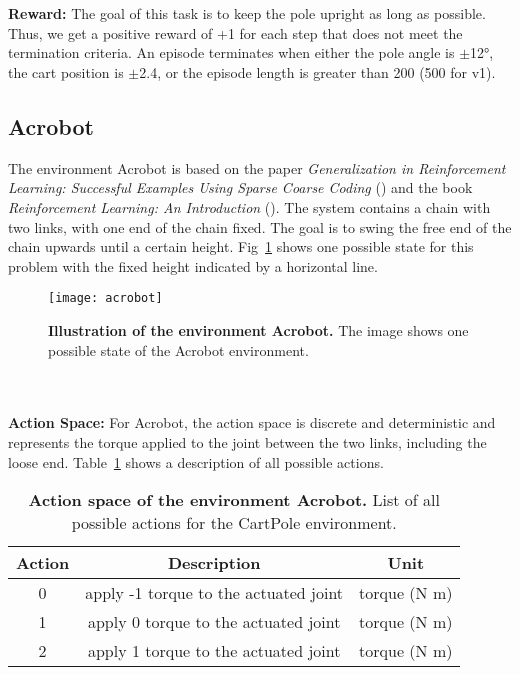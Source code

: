\\ \\
\textbf{Reward:} The goal of this task is to keep the pole upright as long as possible. Thus, we get a positive reward of +1 for each step that does not meet the termination criteria. An episode terminates when either the pole angle is $\pm$12°, the cart position is $\pm$2.4, or the episode length is greater than 200 (500 for v1).

\subsection{Acrobot}
The environment Acrobot is based on the paper \emph{Generalization in Reinforcement Learning: Successful Examples Using Sparse Coarse Coding} (\cite{NIPS1995_8f1d4362}) and the book \emph{Reinforcement Learning: An Introduction} (\cite{montague1999reinforcement}). The system contains a chain with two links, with one end of the chain fixed. The goal is to swing the free end of the chain upwards until a certain height. Fig~\ref{fig:acrobot} shows one possible state for this problem with the fixed height indicated by a horizontal line.
\begin{figure}[!ht]
  \centering
\texttt{[image: acrobot]}
\caption[Illustration of the environment Acrobot]{
  \textbf{Illustration of the environment Acrobot.}
  The image shows one possible state of the Acrobot environment.
}
\label{fig:acrobot}
\end{figure}
\\ \\
\textbf{Action Space:} For Acrobot, the action space is discrete and deterministic and represents the torque applied to the joint between the two links, including the loose end. Table~\ref{table:acrobot_act} shows a description of all possible actions.
\begin{table}[!ht]
  \centering
  \begin{tabular}{ |c|c|c| }
    \hline
    Action & Description & Unit \\
    \hline
    0 & apply -1 torque to the actuated joint & torque (N m) \\
    1 & apply 0 torque to the actuated joint & torque (N m) \\
    2 & apply 1 torque to the actuated joint & torque (N m) \\
    \hline
  \end{tabular}
  \caption[Action space of the environment Acrobot]{
    \textbf{Action space of the environment Acrobot.}
    List of all possible actions for the CartPole environment.
  }
  \label{table:acrobot_act}
\end{table}
